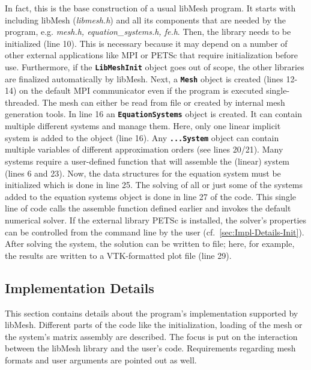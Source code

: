 In fact, this is the base construction of a usual libMesh program. It starts with including libMesh (\textit{libmesh.h}) and all its components that are needed by the program, e.g. \textit{mesh.h, equation\_systems.h, fe.h}. Then, the library needs to be initialized (line 10). This is necessary because it may depend on a number of other external applications like MPI or PETSc that require initialization before use. Furthermore, if the \texttt{\textbf{LibMeshInit}} object goes out of scope, the other libraries are finalized automatically by libMesh. Next, a \texttt{\textbf{Mesh}} object is created (lines 12-14) on the default MPI communicator even if the program is executed single-threaded. The mesh can either be read from file or created by internal mesh generation tools. In line 16 an \texttt{\textbf{EquationSystems}} object is created. It can contain multiple different systems and manage them. Here, only one linear implicit system is added to the object (line 16). Any \texttt{\textbf{...System}} object can contain multiple variables of different approximation orders (see lines 20/21). Many systems require a user-defined function that will assemble the (linear) system (lines 6 and 23). Now, the data structures for the equation system must be initialized which is done in line 25. The solving of all or just some of the systems added to the equation systems object is done in line 27 of the code. This single line of code calls the assemble function defined earlier and invokes the default numerical solver. If the external library PETSc is installed, the solver's properties can be controlled from the command line by the user (cf.~\ref{sec:Impl-Details-Init}). After solving the system, the solution can be written to file; here, for example, the results are written to a VTK-formatted plot file (line 29).
 
 \subsection{Implementation Details}\label{sec:Impl-Details}
  This section contains details about the program's implementation supported by libMesh. Different parts of the code like the initialization, loading of the mesh or the system's matrix assembly are described. The focus is put on the interaction between the libMesh library and the user's code. Requirements regarding mesh formats and user arguments are pointed out as well.

 
